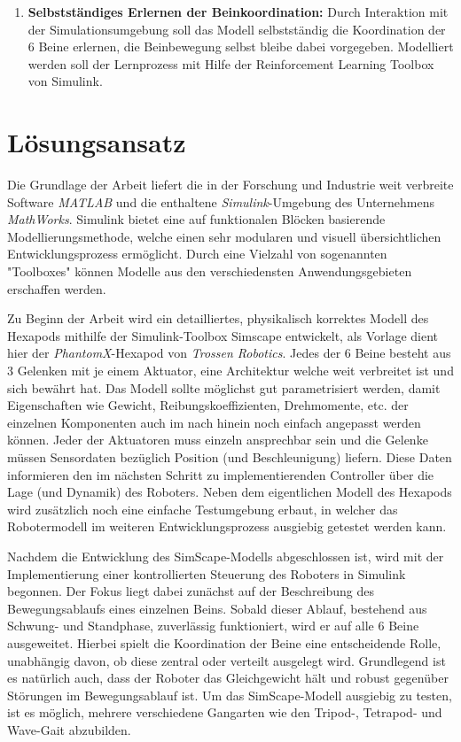 \begin{enumerate}
	
	
	\item \textbf{Selbstständiges Erlernen der Beinkoordination:} Durch Interaktion mit der Simulationsumgebung soll das Modell selbstständig die Koordination der 6 Beine erlernen, die Beinbewegung selbst bleibe dabei vorgegeben.
	Modelliert werden soll der Lernprozess mit Hilfe der Reinforcement Learning Toolbox von Simulink.
	
\end{enumerate}

\section{Lösungsansatz}
Die Grundlage der Arbeit liefert die in der Forschung und Industrie weit verbreite Software \textit{MATLAB\textregistered} und die enthaltene \textit{Simulink}\textregistered-Umgebung des Unternehmens \textit{MathWorks}.
Simulink bietet eine auf funktionalen Blöcken basierende Modellierungsmethode, welche einen sehr modularen und visuell übersichtlichen Entwicklungsprozess ermöglicht.
Durch eine Vielzahl von sogenannten "Toolboxes" können Modelle aus den verschiedensten Anwendungsgebieten erschaffen werden.

Zu Beginn der Arbeit wird ein detailliertes, physikalisch korrektes Modell des Hexapods mithilfe der Simulink-Toolbox Simscape entwickelt, als Vorlage dient hier der \emph{PhantomX}-Hexapod von \emph{Trossen Robotics}.
Jedes der 6 Beine besteht aus 3 Gelenken mit je einem Aktuator, eine Architektur welche weit verbreitet ist und sich bewährt hat.
Das Modell sollte möglichst gut parametrisiert werden, damit Eigenschaften wie Gewicht, Reibungskoeffizienten, Drehmomente, etc. der einzelnen Komponenten auch im nach hinein noch einfach angepasst werden können.
Jeder der Aktuatoren muss einzeln ansprechbar sein und die Gelenke müssen Sensordaten bezüglich Position (und Beschleunigung) liefern.
Diese Daten informieren den im nächsten Schritt zu implementierenden Controller über die Lage (und Dynamik) des Roboters.
Neben dem eigentlichen Modell des Hexapods wird zusätzlich noch eine einfache Testumgebung erbaut, in welcher das Robotermodell im weiteren Entwicklungsprozess ausgiebig getestet werden kann.

Nachdem die Entwicklung des SimScape-Modells abgeschlossen ist, wird mit der Implementierung einer kontrollierten Steuerung des Roboters in Simulink begonnen.
Der Fokus liegt dabei zunächst auf der Beschreibung des Bewegungsablaufs eines einzelnen Beins.
Sobald dieser Ablauf, bestehend aus Schwung- und Standphase, zuverlässig funktioniert, wird er auf alle 6 Beine ausgeweitet.
Hierbei spielt die Koordination der Beine eine entscheidende Rolle, unabhängig davon, ob diese zentral oder verteilt ausgelegt wird.
Grundlegend ist es natürlich auch, dass der Roboter das Gleichgewicht hält und robust gegenüber Störungen im Bewegungsablauf ist.
Um das SimScape-Modell ausgiebig zu testen, ist es möglich, mehrere verschiedene Gangarten wie den Tripod-, Tetrapod- und Wave-Gait abzubilden.

